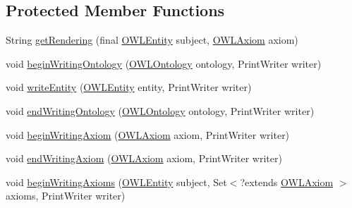 \subsection*{Protected Member Functions}
\begin{DoxyCompactItemize}
\item 
String \hyperlink{classuk_1_1ac_1_1manchester_1_1cs_1_1owlapi_1_1dlsyntax_1_1_d_l_syntax_h_t_m_l_ontology_storer_ab12839ea4f038cf7fa80ac801b34c4ac}{get\-Rendering} (final \hyperlink{interfaceorg_1_1semanticweb_1_1owlapi_1_1model_1_1_o_w_l_entity}{O\-W\-L\-Entity} subject, \hyperlink{interfaceorg_1_1semanticweb_1_1owlapi_1_1model_1_1_o_w_l_axiom}{O\-W\-L\-Axiom} axiom)
\item 
void \hyperlink{classuk_1_1ac_1_1manchester_1_1cs_1_1owlapi_1_1dlsyntax_1_1_d_l_syntax_h_t_m_l_ontology_storer_a9939a5f11429e86b05267601f5ecce65}{begin\-Writing\-Ontology} (\hyperlink{interfaceorg_1_1semanticweb_1_1owlapi_1_1model_1_1_o_w_l_ontology}{O\-W\-L\-Ontology} ontology, Print\-Writer writer)
\item 
void \hyperlink{classuk_1_1ac_1_1manchester_1_1cs_1_1owlapi_1_1dlsyntax_1_1_d_l_syntax_h_t_m_l_ontology_storer_a70089092da10d4ea799e5d4149ab01b2}{write\-Entity} (\hyperlink{interfaceorg_1_1semanticweb_1_1owlapi_1_1model_1_1_o_w_l_entity}{O\-W\-L\-Entity} entity, Print\-Writer writer)
\item 
void \hyperlink{classuk_1_1ac_1_1manchester_1_1cs_1_1owlapi_1_1dlsyntax_1_1_d_l_syntax_h_t_m_l_ontology_storer_ad8507aa7f0e0521df938883b86419b8c}{end\-Writing\-Ontology} (\hyperlink{interfaceorg_1_1semanticweb_1_1owlapi_1_1model_1_1_o_w_l_ontology}{O\-W\-L\-Ontology} ontology, Print\-Writer writer)
\item 
void \hyperlink{classuk_1_1ac_1_1manchester_1_1cs_1_1owlapi_1_1dlsyntax_1_1_d_l_syntax_h_t_m_l_ontology_storer_acb9e34cdf5807ce3ca653c2a72e6f260}{begin\-Writing\-Axiom} (\hyperlink{interfaceorg_1_1semanticweb_1_1owlapi_1_1model_1_1_o_w_l_axiom}{O\-W\-L\-Axiom} axiom, Print\-Writer writer)
\item 
void \hyperlink{classuk_1_1ac_1_1manchester_1_1cs_1_1owlapi_1_1dlsyntax_1_1_d_l_syntax_h_t_m_l_ontology_storer_a1dfa628a60cadb41aaedb9ac23866ba9}{end\-Writing\-Axiom} (\hyperlink{interfaceorg_1_1semanticweb_1_1owlapi_1_1model_1_1_o_w_l_axiom}{O\-W\-L\-Axiom} axiom, Print\-Writer writer)
\item 
void \hyperlink{classuk_1_1ac_1_1manchester_1_1cs_1_1owlapi_1_1dlsyntax_1_1_d_l_syntax_h_t_m_l_ontology_storer_afd11ab0a34bbe6a52b961660382a20ca}{begin\-Writing\-Axioms} (\hyperlink{interfaceorg_1_1semanticweb_1_1owlapi_1_1model_1_1_o_w_l_entity}{O\-W\-L\-Entity} subject, Set$<$?extends \hyperlink{interfaceorg_1_1semanticweb_1_1owlapi_1_1model_1_1_o_w_l_axiom}{O\-W\-L\-Axiom} $>$ axioms, Print\-Writer writer)

\end{DoxyCompactItemize}
